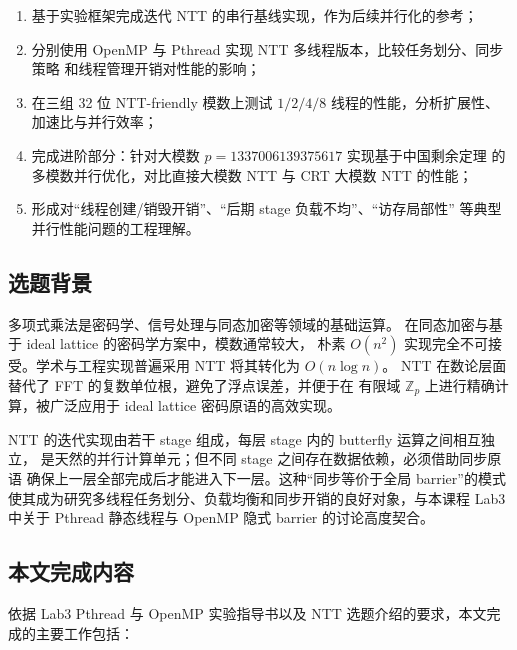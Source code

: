 \documentclass[UTF8,a4paper,10pt]{ctexart}
\begin{document}
\begin{enumerate}
  \item 基于实验框架完成迭代 NTT 的串行基线实现，作为后续并行化的参考；
  \item 分别使用 OpenMP 与 Pthread 实现 NTT 多线程版本，比较任务划分、同步策略
        和线程管理开销对性能的影响；
  \item 在三组 32 位 NTT-friendly 模数上测试 $1/2/4/8$ 线程的性能，分析扩展性、
        加速比与并行效率；
  \item 完成进阶部分：针对大模数 $p = 1337006139375617$ 实现基于中国剩余定理\cite{knuth1997art}
        的多模数并行优化，对比直接大模数 NTT 与 CRT 大模数 NTT 的性能；
  \item 形成对“线程创建/销毁开销”、“后期 stage 负载不均”、“访存局部性”
        等典型并行性能问题的工程理解。
\end{enumerate}

\subsection{选题背景}

多项式乘法是密码学、信号处理与同态加密等领域的基础运算。
在同态加密与基于 ideal lattice 的密码学方案中，模数通常较大，
朴素 $O(n^2)$ 实现完全不可接受。学术与工程实现普遍采用 NTT
将其转化为 $O(n \log n)$\cite{cooley1965algorithm}。
NTT 在数论层面替代了 FFT 的复数单位根，避免了浮点误差，并便于在
有限域 $\mathbb{Z}_p$ 上进行精确计算，被广泛应用于 ideal lattice
密码原语的高效实现\cite{longa2016speeding,harvey2014faster}。

NTT 的迭代实现由若干 stage 组成，每层 stage 内的 butterfly 运算之间相互独立，
是天然的并行计算单元；但不同 stage 之间存在数据依赖，必须借助同步原语
确保上一层全部完成后才能进入下一层。这种“同步等价于全局 barrier”的模式
使其成为研究多线程任务划分、负载均衡和同步开销的良好对象，与本课程
Lab3 中关于 Pthread 静态线程与 OpenMP 隐式 barrier 的讨论高度契合。

\subsection{本文完成内容}

依据 Lab3 Pthread 与 OpenMP 实验指导书以及 NTT 选题介绍的要求，本文完成的主要工作包括：
\end{document}

